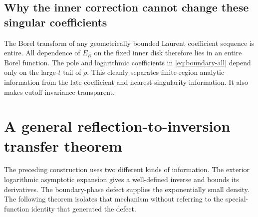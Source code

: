 \documentclass[11pt,a4paper]{article}
\theoremstyle{definition}
\numberwithin{equation}{section}
\begin{document}
\subsection{Why the inner correction cannot change these singular coefficients}
The Borel transform of any geometrically bounded Laurent coefficient sequence is entire. All dependence of $E_R$ on the fixed inner disk therefore lies in an entire Borel function. The pole and logarithmic coefficients in \eqref{eq:boundary-all} depend only on the large-$t$ tail of $\rho$. This cleanly separates finite-region analytic information from the late-coefficient and nearest-singularity information. It also makes cutoff invariance transparent.

\section{A general reflection-to-inversion transfer theorem}
\label{sec:general}

The preceding construction uses two different kinds of information. The exterior logarithmic asymptotic expansion gives a well-defined inverse and bounds its derivatives. The boundary-phase defect supplies the exponentially small density. The following theorem isolates that mechanism without referring to the special-function identity that generated the defect.
\end{document}
